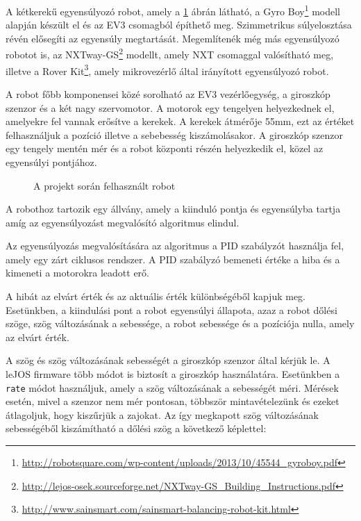 A kétkerekű egyensúlyozó robot, amely a \ref{fig:gyro_boy} ábrán látható, a Gyro Boy\footnote{\href{http://robotsquare.com/wp-content/uploads/2013/10/45544\_gyroboy.pdf}{http://robotsquare.com/wp-content/uploads/2013/10/45544\_gyroboy.pdf}} modell alapján készült el és az EV3 csomagból építhető meg. Szimmetrikus súlyelosztása révén elősegíti az egyensúly megtartását. Megemlítenék még más egyensúlyozó robotot is, az NXTway-GS\footnote{\href{http://lejos-osek.sourceforge.net/NXTway-GS\_Building\_Instructions.pdf}{http://lejos-osek.sourceforge.net/NXTway-GS\_Building\_Instructions.pdf}} modellt, amely NXT csomaggal valósítható meg, illetve a Rover Kit\footnote{\href{http://www.sainsmart.com/sainsmart-balancing-robot-kit.html}{http://www.sainsmart.com/sainsmart-balancing-robot-kit.html}}, amely mikrovezérlő által irányított egyensúlyozó robot.

A robot főbb komponensei közé sorolható az EV3 vezérlőegység, a giroszkóp szenzor és a két nagy szervomotor. A motorok egy tengelyen helyezkednek el, amelyekre fel vannak erősítve a kerekek. A kerekek átmérője 55mm, ezt az értéket felhasználjuk a pozíció illetve a sebebesség kiszámolásakor. A giroszkóp szenzor egy tengely mentén mér és a robot központi részén helyezkedik el, közel az egyensúlyi pontjához.

\begin{figure}[!htb]
	\centering
	\caption{A projekt során felhasznált robot}
	\label{fig:gyro_boy}
\end{figure}

A robothoz tartozik egy állvány, amely a kiinduló pontja és egyensúlyba tartja amíg az egyensúlyozást megvalósító algoritmus elindul. 

Az egyensúlyozás megvalósítására az algoritmus a PID szabályzót használja fel, amely egy zárt ciklusos rendszer. A PID szabályzó bemeneti értéke a hiba és a kimeneti a motorokra leadott erő.

A hibát az elvárt érték és az aktuális érték különbségéből kapjuk meg. Esetünkben, a kiindulási pont a robot egyensúlyi állapota, azaz a robot dőlési szöge, szög változásának a sebessége, a robot sebessége és a pozíciója nulla, amely az elvárt érték. 

A szög és szög változásának sebességét a giroszkóp szenzor által kérjük le. A leJOS firmware több módot is biztosít a giroszkóp használatára. Esetünkben a \texttt{rate} módot használjuk, amely a szög változásának a sebességét méri. Mérések esetén, mivel a szenzor nem mér pontosan, többször mintavételezünk és ezeket átlagoljuk, hogy kiszűrjük a zajokat. Az így megkapott szög változásának sebességéből kiszámítható a dőlési szög a következő képlettel: 

